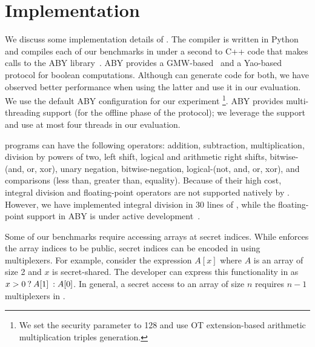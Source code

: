 \section{Implementation}
\label{sec:impl}
We discuss some  implementation details of \tool.
The  \tool compiler is written in Python and
compiles each of our benchmarks in under a second to C++ code that
makes calls to the ABY
library~\cite{aby}. 
ABY provides a GMW-based~\cite{gmw} and a  Yao-based~\cite{yao} protocol for boolean computations.
Although \tool can generate code for both, we have observed better performance when using the latter
and use it in our evaluation.
We use the default ABY configuration for our
experiment \footnote{We set the security parameter to 128 and use OT
extension-based arithmetic multiplication triples generation.}. ABY
provides multi-threading support (for the offline phase of the \mpc
protocol); we leverage the support and use at most four threads in our
evaluation. 

\tool programs can have the following operators:
addition, subtraction, multiplication, division by powers of two, left
shift,
logical and arithmetic right shifts, bitwise-(and, or, xor), unary
negation, 
bitwise-negation, logical-(not, and, or, xor), and comparisons (less
than, greater than, equality). 
Because of their high cost, integral division and floating-point
operators are not supported natively by \tool. 
However, we have implemented integral division in 30 lines of \tool,
while the floating-point support in ABY is under active
development~\cite{ddkssz15}.

Some of our benchmarks require accessing arrays at secret
indices. While \tool enforces the array indices to be
public, secret indices can be encoded in \tool using multiplexers.
For example, consider the expression $A[x]$ where $A$ is an array of
size 2 and $x$ is secret-shared. The developer can express
this functionality in \tool as ${{x > 0}\:?\:{A[1]}\::{A[0]}}$. In general,
a secret access to an array of
size $n$ requires ${n}-1$ multiplexers in \tool.


